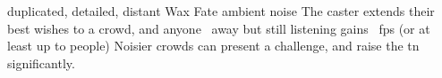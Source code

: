   {duplicated, detailed, distant}%
  {Wax}%
  {Fate}%
  {ambient noise}%
  {The caster extends their best wishes to a crowd, and anyone \spellRange\ away but still listening gains \showDam~\glspl{fp} (or at least up to  people)}%
  {Noisier crowds can present a challenge, and raise the \gls{tn} significantly.}
